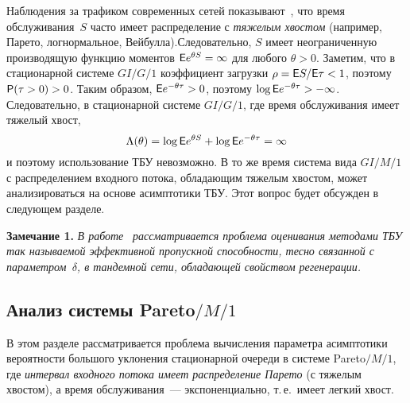 \begin{multicols}{2}
 Наблюдения за  трафиком современных сетей показывают~\cite{Will}, что время
обслуживания~$S$ час\-то  имеет распределение с {\it тяжелым хвостом}
(например, Парето, логнормальное, Вейбулла).\linebreak Следовательно,  $S$
имеет неограниченную производящую функцию моментов $ {\sf E} e^{\theta S}
= \infty$ для любого  $\theta
>0$.  Заметим, что  в  стационарной системе $GI/G/1$ коэффициент загрузки
$\rho= {\sf E} S/{\sf E} \tau<1$, поэтому ${\sf P}(\tau>0)>0$. Таким образом, ${\sf E}
e^{-\theta \tau}>0$, поэтому  $\log{\sf E} e^{-\theta \tau}>-\infty$.
Следовательно, в  стационарной системе $GI/G/1$, где время
обслуживания имеет тяжелый хвост,
\begin{equation*}
\Lambda(\theta) = \log{\sf E} e^{\theta S} + \log {\sf E} e^{-\theta \tau} =
\infty 
\end{equation*}
 и поэтому
использование  ТБУ невозможно.  В то же время система вида $GI/M/1$
с распределением  входного потока, обладающим тяжелым хвостом, может
анализироваться на основе асимптотики  ТБУ. Этот вопрос будет
обсужден в следующем разделе.

\medskip

\noindent
\textbf{Замечание 1.} \textit{В работе}~\cite{avb4} \textit{рассматривается
проблема оценивания методами ТБУ так называемой {\it эффективной
пропускной способности}, тесно связанной с параметром~$\delta$, в
тандемной сети, обладающей свойством регенерации.}


\subsection{Анализ системы Pareto$/M/1$}

В этом разделе рассматривается  проблема вы\-чис\-ле\-ния параметра
асимптотики вероятности большого уклонения стационарной очереди в
сис\-те\-ме Pareto$/M/1$, где {\it интервал входного потока имеет
распределение Парето}  (с тяжелым хвостом), а время обслуживания~---
экспоненциально, т.\,е.\ имеет легкий хвост.


\end{multicols}
